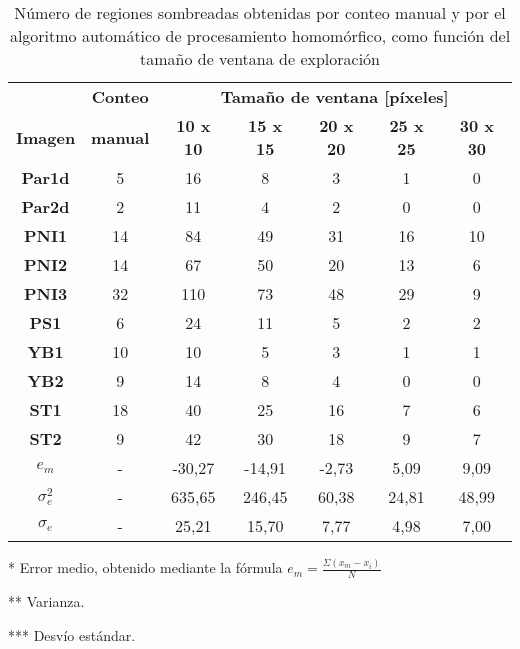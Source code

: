 \begin{table}[]
    \centering
    \begin{threeparttable}[b]
        
        \caption{Número de regiones sombreadas obtenidas por conteo manual y por el algoritmo automático de procesamiento homomórfico, como función del tamaño de ventana de exploración}
        \label{tab:resultados_homomorfico}
        \begin{tabular}{ccccccc}
        \hline
        \hline
                  & \textbf{Conteo}  & \multicolumn{5}{c}{\textbf{Tamaño de ventana [píxeles]}}   \\
            \textbf{Imagen}& \textbf{manual}  & \textbf{10 x 10}     & \textbf{15 x 15}     & \textbf{20 x 20 }   & \textbf{25 x 25}    & \textbf{30 x 30 }   \\ \hline
            \textbf{Par1d}  & 5  & 16      & 8      & 3     & 1     & 0     \\
            \textbf{Par2d}  & 2  & 11      & 4      & 2     & 0     & 0     \\
            \textbf{PNI1}   & 14 & 84     & 49     & 31    & 16    & 10    \\
            \textbf{PNI2}   & 14 & 67     & 50     & 20    & 13    & 6     \\
            \textbf{PNI3}   & 32 & 110    & 73     & 48    & 29    & 9     \\
            \textbf{PS1}    & 6  & 24     & 11     & 5     & 2     & 2     \\ 
            \textbf{YB1}    & 10 & 10     & 5      & 3     & 1     & 1     \\
            \textbf{YB2}    & 9  & 14     & 8      & 4     & 0     & 0     \\
            \textbf{ST1}    & 18 & 40     & 25     & 16    & 7     & 6     \\
            \textbf{ST2}    & 9  & 42     & 30     & 18    & 9     & 7     \\ \hline
            $e_{m}$\tnote{*}    & -  & -30,27 & -14,91 & -2,73 & 5,09  & 9,09  \\ 
            $\sigma^2_{e}$ \tnote{**}   & -  & 635,65  & 246,45 & 60,38 & 24,81 & 48,99 \\
           $\sigma_{e}$ \tnote{***}   & -  & 25,21  & 15,70  & 7,77  & 4,98  & 7,00 \\ \hline \hline
        \end{tabular}
        \begin{tablenotes}
        \footnotesize{
                \item [*]Error medio, obtenido mediante la fórmula $e_{m}=\frac{\Sigma(x_{m}-x_i)}{N}$
                \item [**]Varianza.
                \item [***] Desvío estándar.
                }
        \end{tablenotes}
  \end{threeparttable}
\end{table}
       